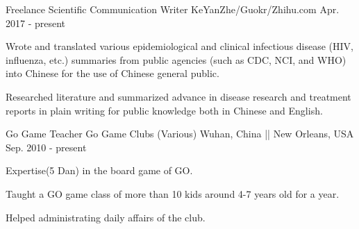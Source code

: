 

\begin{cventries}

  \cventry
    {Freelance Scientific Communication Writer} %
    {KeYanZhe/Guokr/Zhihu.com} %
    {} %
    {Apr. 2017 - present} %
    {
      \begin{cvitems} %
        \item {Wrote and translated various epidemiological and clinical infectious disease (HIV, influenza, etc.) summaries from public agencies (such as CDC, NCI, and WHO) into Chinese for the use of Chinese general public.}
        \item {Researched literature and summarized advance in disease research and treatment reports in plain writing for public knowledge both in Chinese and English.}
      \end{cvitems}
    }



  \cventry
    {Go Game Teacher} %
    {Go Game Clubs (Various)} %
    {Wuhan, China || New Orleans, USA} %
    {Sep. 2010 - present} %
    {
      \begin{cvitems} %
        \item {Expertise(5 Dan) in the board game of GO.}
        \item {Taught a GO game class of more than 10 kids around 4-7 years old for a year.}
        \item {Helped administrating daily affairs of the club.}
      \end{cvitems}
    }

\end{cventries}